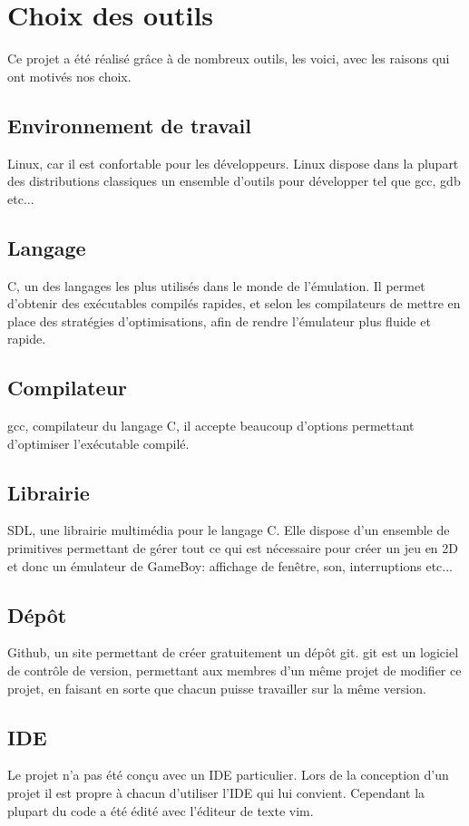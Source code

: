 \documentclass{report}
\begin{document}
\section{Choix des outils}
Ce projet a été réalisé grâce à de nombreux outils, les voici, avec les raisons qui ont motivés nos choix.\\

\subsection{Environnement de travail}
Linux, car il est confortable pour les développeurs. Linux dispose dans la plupart des distributions classiques un ensemble d'outils pour développer tel que gcc, gdb etc...

\subsection{Langage}
C, un des langages les plus utilisés dans le monde de l'émulation. Il permet d'obtenir des exécutables compilés rapides, et selon les compilateurs de mettre en place des stratégies d'optimisations, afin de rendre l'émulateur plus fluide et rapide.

\subsection{Compilateur}
gcc, compilateur du langage C, il accepte beaucoup d'options permettant d'optimiser l'exécutable compilé.

\subsection{Librairie}
SDL, une librairie multimédia pour le langage C. Elle dispose d'un ensemble de primitives permettant de gérer tout ce qui est nécessaire pour créer un jeu en 2D et donc un émulateur de GameBoy: affichage de fenêtre, son, interruptions etc...

\subsection{Dépôt}
Github, un site permettant de créer gratuitement un dépôt git. git est un logiciel de contrôle de version, permettant aux membres d'un même projet de modifier ce projet, en faisant en sorte que chacun puisse travailler sur la même version.

\subsection{IDE}
Le projet n'a pas été conçu avec un IDE particulier. Lors de la conception d'un projet il est propre à chacun d'utiliser l'IDE qui lui convient. Cependant la plupart du code a été édité avec l'éditeur de texte vim.
\end{document}
